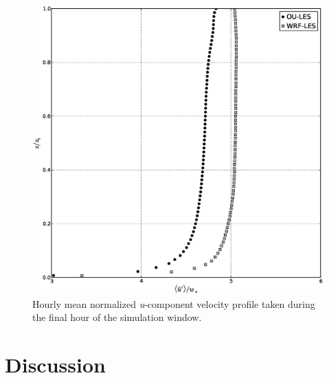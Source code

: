 \begin{figure}[!ht]
\begin{center}
\includegraphics[width=\textwidth]{figures/chapter5/velocity}
\end{center}
\caption{Hourly mean normalized \textit{u}-component velocity profile taken during the final hour of the simulation window.}
\label{figure512}
\end{figure}


\section{Discussion}
\label{dis-54}

